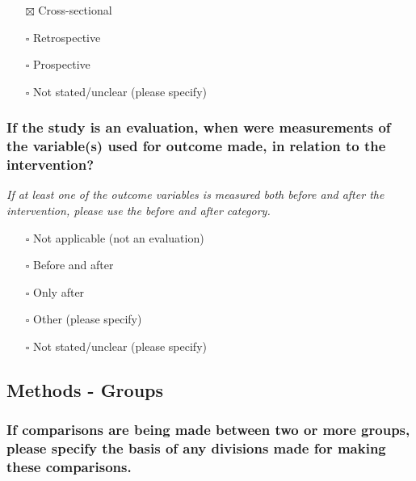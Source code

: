 \documentclass[
  doc, a4paper]{apa7}
\providecommand{\tightlist}{%
  \setlength{\itemsep}{0pt}\setlength{\parskip}{0pt}}
\begin{document}
\begin{itemize}
\tightlist
\item[$\boxtimes$]
  Cross-sectional\\
\item[$\square$]
  Retrospective\\
\item[$\square$]
  Prospective\\
\item[$\square$]
  Not stated/unclear (please specify)
\end{itemize}

\subsubsection{If the study is an evaluation, when were measurements of the variable(s) used for outcome made, in relation to the intervention?}\label{if-the-study-is-an-evaluation-when-were-measurements-of-the-variables-used-for-outcome-made-in-relation-to-the-intervention}

\emph{If at least one of the outcome variables is measured both before and after the intervention, please use the before and after category.}

\begin{itemize}
\tightlist
\item[$\square$]
  Not applicable (not an evaluation)\\
\item[$\square$]
  Before and after\\
\item[$\square$]
  Only after\\
\item[$\square$]
  Other (please specify)\\
\item[$\square$]
  Not stated/unclear (please specify)
\end{itemize}

\subsection{Methods - Groups}\label{methods---groups}

\subsubsection{If comparisons are being made between two or more groups, please specify the basis of any divisions made for making these comparisons.}\label{if-comparisons-are-being-made-between-two-or-more-groups-please-specify-the-basis-of-any-divisions-made-for-making-these-comparisons.}
\end{document}
